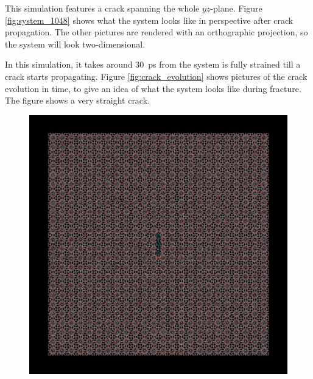 This simulation features a crack spanning the whole $yz$-plane. Figure \ref{fig:system_1048} shows what the system looks like in perspective after crack propagation. The other pictures are rendered with an orthographic projection, so the system will look two-dimensional. 

In this simulation, it takes around \SI{30}{\pico\second} from the system is fully strained till a crack starts propagating. Figure \ref{fig:crack_evolution} shows pictures of the crack evolution in time, to give an idea of what the system looks like during fracture. The figure shows a very straight crack.

\begin{figure}
\begin{minipage}[b]{0.5\linewidth}
\includegraphics[width=\textwidth]{../snapshots/c_1.pdf}
\end{minipage}
\begin{minipage}[b]{0.5\linewidth}

\end{minipage}
\end{figure}
